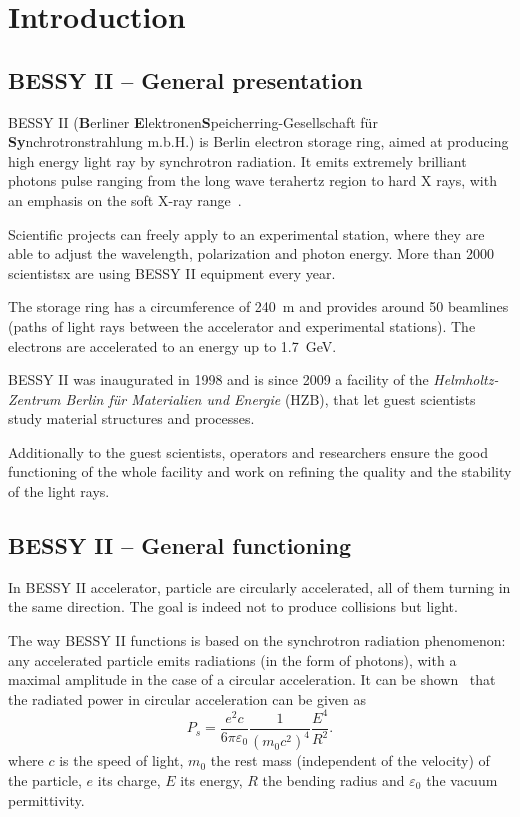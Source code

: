 \chapter{Introduction}
\label{sec:background}

\section{BESSY II -- General presentation}
BESSY II (\textbf{B}erliner \textbf{E}lektronen\-\textbf{S}peicherring-Gesellschaft für \textbf{Sy}n\-chro\-tron\-strahlung m.b.H.) is Berlin electron storage ring, aimed at producing high energy light ray by synchrotron radiation. It emits extremely brilliant photons pulse ranging from the long wave terahertz region to hard X rays, with an emphasis on the soft X-ray range~\cite{web:bessy_homepage}.

Scientific projects can freely apply to an experimental station, where they are able to adjust the wavelength, polarization and photon energy. More than 2000 scientistsx are using BESSY II equipment every year.

The storage ring has a circumference of \SI{240}{\meter} and provides around 50 beamlines (paths of light rays between the accelerator and experimental stations). The electrons are accelerated to an energy up to \SI{1.7}{\giga\electronvolt}.

BESSY II was inaugurated in 1998 and is since 2009 a facility of the \textit{Helmholtz-Zentrum Berlin für Materialien und Energie} (HZB), that let guest scientists study material structures and processes.

Additionally to the guest scientists, operators and researchers ensure the good functioning of the whole facility and work on refining the quality and the stability of the light rays.

\section{BESSY II -- General functioning}
In BESSY II  accelerator, particle are circularly accelerated, all of them turning in the same direction. The goal is indeed not to produce collisions but light.

The way BESSY II functions is based on the synchrotron radiation phenomenon: any accelerated particle emits radiations (in the form of photons), with a maximal amplitude in the case of a circular acceleration. It can be shown~\cite{book:wille} that the radiated power in circular acceleration can be given as
\begin{equation}
P_s = \frac{e^2 c}{6 \pi \varepsilon_0}\frac{1}{(m_0 c^2)^4}\frac{E^4}{R^2}.
\end{equation}
where $c$ is the speed of light, $m_0$ the rest mass (independent of the velocity) of the particle, $e$ its charge, $E$ its energy, $R$ the bending radius and $\varepsilon_0$ the  vacuum permittivity.

